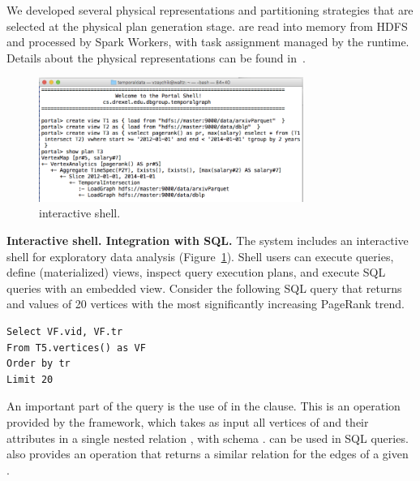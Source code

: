 


We developed several physical representations and partitioning
strategies that are selected at the physical plan generation
stage. \tgs are read into memory from HDFS and processed by Spark
Workers, with task assignment managed by the runtime.  Details about
the physical representations can be found in~\cite{PortalarXiv2016}.

\begin{figure}[t]
\centering
\includegraphics[width=3.4in]{figs/shell.png}
\caption{\sys interactive shell.}
\label{fig:shell}
\end{figure}

{\bf Interactive shell. Integration with SQL.}  The \sys system
includes an interactive shell for exploratory data analysis
(Figure~\ref{fig:shell}). Shell users can execute queries, define
(materialized) views, inspect query execution plans, and execute SQL
queries with an embedded \ql view. Consider the following SQL query
that returns  and  values of 20 vertices with the
most significantly increasing PageRank trend.

\begin{small}
\begin{verbatim}
Select VF.vid, VF.tr
From T5.vertices() as VF
Order by tr
Limit 20
\end{verbatim}
\end{small}

An important part of the query is the use of  in
the  clause. This is an operation provided by the \sys
framework, which takes as input all vertices of  and their
attributes in a single nested relation , with schema
.  can be
used in SQL queries. \sys also provides an operation 
that returns a similar relation for the edges of a given \tg.



